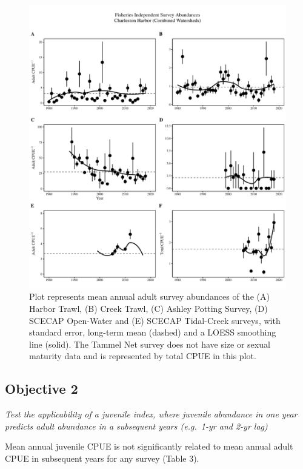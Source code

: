\documentclass[
]{article}
\begin{document}
\begin{figure}
\centering
\includegraphics{NEWCh1_Figs_files/figure-latex/Figure 2 (CRMS Survey Time Series)-1.pdf}
\caption{Plot represents mean annual adult survey abundances of the (A)
Harbor Trawl, (B) Creek Trawl, (C) Ashley Potting Survey, (D) SCECAP
Open-Water and (E) SCECAP Tidal-Creek surveys, with standard error,
long-term mean (dashed) and a LOESS smoothing line (solid). The Tammel
Net survey does not have size or sexual maturity data and is represented
by total CPUE in this plot.}
\end{figure}

\newpage

\hypertarget{objective-2}{%
\subsection{Objective 2}\label{objective-2}}

\emph{Test the applicability of a juvenile index, where juvenile
abundance in one year predicts adult abundance in a subsequent years
(e.g.~1-yr and 2-yr lag)}

Mean annual juvenile CPUE is not significantly related to mean annual
adult CPUE in subsequent years for any survey (Table 3).
\end{document}
